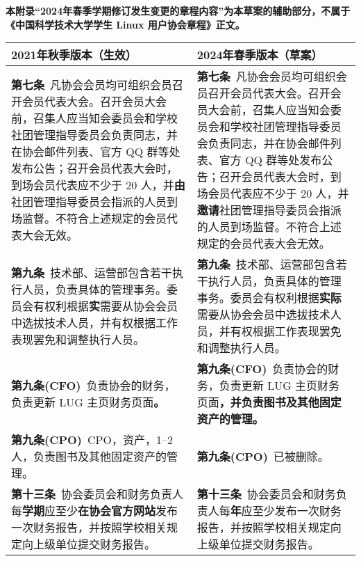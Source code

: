 \documentclass[a4paper, 12pt, twoside]{ctexart}
\begin{document}
	\begin{center}
		\textbf{本附录“2024年春季学期修订发生变更的章程内容”为本草案的辅助部分，不属于《中国科学技术大学学生 Linux 用户协会章程》正文。}
	\end{center}
	
	\begin{table}[H]
		\centering
		\begin{tabularx}{\textwidth}{XX}
			\toprule
			\textbf{2021年秋季版本（生效）} & \textbf{2024年春季版本（草案）} \\
			\midrule
			\textbf{第七条}\ 凡协会会员均可组织会员召开会员代表大会。召开会员大会前，召集人应当知会委员会和学校社团管理指导委员会负责同志，并在协会邮件列表、官方 QQ 群等处发布公告；召开会员代表大会时，到场会员代表应不少于 20 人，并\textbf{由}社团管理指导委员会指派的人员到场监督。不符合上述规定的会员代表大会无效。 & \textbf{第七条}\ 凡协会会员均可组织会员召开会员代表大会。召开会员大会前，召集人应当知会委员会和学校社团管理指导委员会负责同志，并在协会邮件列表、官方 QQ 群等处发布公告；召开会员代表大会时，到场会员代表应不少于 20 人，并\textbf{邀请}社团管理指导委员会指派的人员到场监督。不符合上述规定的会员代表大会无效。 \\
			\midrule
			\textbf{第九条}\ 技术部、运营部包含若干执行人员，负责具体的管理事务。委员会有权利根据\textbf{实}需要从协会会员中选拔技术人员，并有权根据工作表现罢免和调整执行人员。 & \textbf{第九条}\ 技术部、运营部包含若干执行人员，负责具体的管理事务。委员会有权利根据\textbf{实际}需要从协会会员中选拔技术人员，并有权根据工作表现罢免和调整执行人员。 \\
			\midrule
			\textbf{第九条(CFO)}\ 负责协会的财务，负责更新 LUG 主页财务页面\textbf{。} & \textbf{第九条(CFO)}\ 负责协会的财务，负责更新 LUG 主页财务页面\textbf{，并负责图书及其他固定资产的管理。} \\
			\midrule
			\textbf{第九条(CPO)}\ CPO，资产，1--2人，负责图书及其他固定资产的管理。 & \textbf{第九条(CPO)}\ 已被删除。\\
			\midrule
			\textbf{第十三条}\ 协会委员会和财务负责人每\textbf{学期}应至少\textbf{在协会官方网站}发布一次财务报告，并按照学校相关规定向上级单位提交财务报告。 & \textbf{第十三条}\ 协会委员会和财务负责人每\textbf{年}应至少发布一次财务报告，并按照学校相关规定向上级单位提交财务报告。\\
			\bottomrule
		\end{tabularx}
	\end{table}
\end{document}
